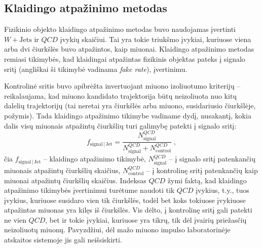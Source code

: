 \documentclass[a4paper, 12pt, oneside]{article}
\newcommand{\WJets}{W\! +\!\mathrm{Jets}}
\newcommand{\QCD}{QC\! D}
\newlength\q
\begin{document}
\subsection{Klaidingo atpažinimo metodas}
Fizikinio objekto klaidingo atpažinimo metodas buvo naudojamas įvertinti $\WJets$ ir $\QCD$ įvykių skaičiui.
Tai yra tokie triukšmo įvykiai, kuriuose viena arba dvi čiurkšlės buvo atpažintos, kaip miuonai.
Klaidingo atpažinimo metodas remiasi tikimybės, kad klaidingai atpažintas fizikinis objektas pateks į signalo sritį
(angliškai ši tikimybė vadinama \textit{fake rate}), įvertinimu.

Kontrolinė sritis buvo apibrėžta invertuojant miuono izoliuotumo kriterijų -- reikalaujama, kad miuono kandidato
trajektorija būtų neizoliuota nuo kitų dalelių trajektorijų (tai neretai yra čiurkšlės arba miuono, susidariusio čiurkšlėje, požymis).
Tada klaidingo atpažinimo tikimybe vadiname dydį, nusakantį, kokia dalis visų miuonais atpažintų čiurkšlių turi galimybę patekti
į signalo sritį:
\begin{equation} \label{eq:FR}
	f_{\mathrm{signal} \,| \,\mathrm{Jet}} =
	\frac{N^{\QCD}_{\mathrm{signal}}}{N^{\QCD}_{\mathrm{signal}}+N^{\QCD}_{\mathrm{control}}} \; ,
\end{equation}
čia $f_{\mathrm{signal} \,| \,\mathrm{Jet}}$ -- klaidingo atpažinimo tikimybė, $N^{\QCD}_{\mathrm{signal}}$ -- į signalo sritį
patenkančių miuonais atpažintų čiurkšlių skaičius, $N^{\QCD}_{\mathrm{control}}$ -- į kontrolinę sritį patenkančių kaip miuonai
atpažintų čiurkšlių skaičius.
Indeksas $\QCD$ žymi faktą, kad klaidingo atpažinimo tikimybės įvertinimui turėtume naudoti tik $\QCD$ įvykius, t.y., tuos
įvykius, kuriuose susidaro vien tik čiurkšlės, todėl bet koks tokiuose įvykiuose atpažintas miuonas yra kilęs iš čiurkšlės.
Vis dėlto, į kontrolinę sritį gali patekti ne vien $\QCD$, bet ir tokie įvykiai, kuriuose yra tikrų, tik dėl įvairių
priežasčių neizoliuotų miuonų.
Pavyzdžiui, dėl mažo miuono impulso laboratorinėje atskaitos sistemoje jis gali neišsiskirti.
\end{document}
